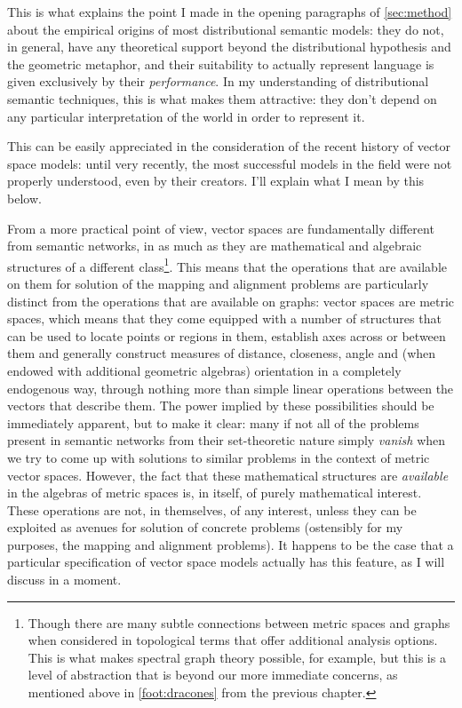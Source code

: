 This is what explains the point I made in the opening paragraphs of \autoref{sec:method} about the empirical origins of most distributional semantic models: they do not, in general, have any theoretical support beyond the distributional hypothesis and the geometric metaphor, and their suitability to actually represent language is given exclusively by their \emph{performance}.
In my understanding of distributional semantic techniques, this is what makes them attractive: they don't depend on any particular interpretation of the world in order to represent it.

This can be easily appreciated in the consideration of the recent history of vector space models: until very recently, the most successful models in the field were not properly understood, even by their creators.
I'll explain what I mean by this below.

From a more practical point of view, vector spaces are fundamentally different from semantic networks, in as much as they are mathematical and algebraic structures of a different class\footnote{
    Though there are many subtle connections between metric spaces and graphs when considered in topological terms that offer additional analysis options.
    This is what makes spectral graph theory possible, for example, but this is a level of abstraction that is beyond our more immediate concerns, as mentioned above in \autoref{foot:dracones} from the previous chapter.
}.
This means that the operations that are available on them for solution of the mapping and alignment problems are particularly distinct from the operations that are available on graphs: vector spaces are metric spaces, which means that they come equipped with a number of structures that can be used to locate points or regions in them, establish axes across or between them and generally construct measures of distance, closeness, angle and (when endowed with additional geometric algebras) orientation in a completely endogenous way, through nothing more than simple linear operations between the vectors that describe them.
The power implied by these possibilities should be immediately apparent, but to make it clear: many if not all of the problems present in semantic networks from their set-theoretic nature simply \emph{vanish} when we try to come up with solutions to similar problems in the context of metric vector spaces.
However, the fact that these mathematical structures are \emph{available} in the algebras of metric spaces is, in itself, of purely mathematical interest.
These operations are not, in themselves, of any interest, unless they can be exploited as avenues for solution of concrete problems (ostensibly for my purposes, the mapping and alignment problems).
It happens to be the case that a particular specification of vector space models actually has this feature, as I will discuss in a moment.

